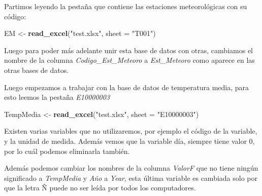 \documentclass[]{book}
\newenvironment{Shaded}{\begin{snugshade}}{\end{snugshade}}
\newcommand{\DataTypeTok}[1]{\textcolor[rgb]{0.13,0.29,0.53}{#1}}
\newcommand{\KeywordTok}[1]{\textcolor[rgb]{0.13,0.29,0.53}{\textbf{#1}}}
\newcommand{\NormalTok}[1]{#1}
\newcommand{\OperatorTok}[1]{\textcolor[rgb]{0.81,0.36,0.00}{\textbf{#1}}}
\newcommand{\StringTok}[1]{\textcolor[rgb]{0.31,0.60,0.02}{#1}}
\begin{document}
Partimos leyendo la pestaña que contiene las estaciones meteorológicas
con su código:

\begin{Shaded}
\begin{Highlighting}[]
\NormalTok{EM <-}\StringTok{ }\KeywordTok{read_excel}\NormalTok{(}\StringTok{"test.xlsx"}\NormalTok{, }\DataTypeTok{sheet =} \StringTok{"T001"}\NormalTok{)}
\end{Highlighting}
\end{Shaded}

Luego para poder más adelante unir esta base de datos con otras,
cambiamos el nombre de la columna \emph{Codigo\_Est\_Meteoro} a
\emph{Est\_Meteoro} como aparece en las otras bases de datos.

\begin{Shaded}
\end{Shaded}

Luego empezamos a trabajar con la base de datos de temperatura media,
para esto leemos la pestaña \emph{E10000003}

\begin{Shaded}
\begin{Highlighting}[]
\NormalTok{TempMedia <-}\StringTok{ }\KeywordTok{read_excel}\NormalTok{(}\StringTok{"test.xlsx"}\NormalTok{, }\DataTypeTok{sheet =} \StringTok{"E10000003"}\NormalTok{)}
\end{Highlighting}
\end{Shaded}

Existen varias variables que no utilizaremos, por ejemplo el código de
la variable, y la unidad de medida. Además vemos que la variable día,
siempre tiene valor 0, por lo cuál podemos eliminarla también.

\begin{Shaded}
\end{Shaded}

Además podemos cambiar los nombres de la columna \emph{ValorF} que no
tiene ningún significado a \emph{TempMedia} y \emph{Año} a \emph{Year},
esta última variable es cambiada solo por que la letra Ñ puede no ser
leída por todos los computadores.
\end{document}
